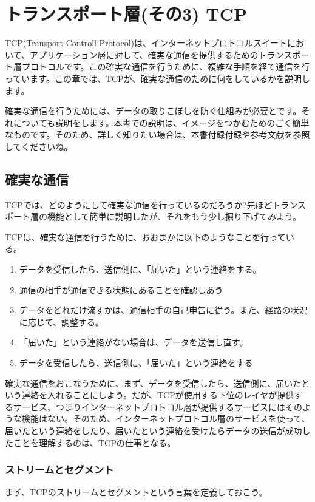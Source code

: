 \chapter{トランスポート層(その3) TCP}


TCP(Transport Controll Protocol)は、インターネットプロトコルスイートにおいて、アプリケーション層に対して、確実な通信を提供するためのトランスポート層プロトコルです。この確実な通信を行うために、複雑な手順を経て通信を行っています。この章では、TCPが、確実な通信のために何をしているかを説明します。

確実な通信を行うためには、データの取りこぼしを防ぐ仕組みが必要とです。それについても説明をします。本書での説明は、イメージをつかむためのごく簡単なものです。そのため、詳しく知りたい場合は、本書付録付録や参考文献を参照してくださいね。

\section{確実な通信}

TCPでは、どのようにして確実な通信を行っているのだろうか?先ほどトランスポート層の機能として簡単に説明したが、それをもう少し掘り下げてみよう。

TCPは、確実な通信を行うために、おおまかに以下のようなことを行っている。

\begin{enumerate}
\item データを受信したら、送信側に、「届いた」という連絡をする。
\item 通信の相手が通信できる状態にあることを確認しあう
\item データをどれだけ流すかは、通信相手の自己申告に従う。また、経路の状況に応じて、調整する。
\item 「届いた」という連絡がない場合は、データを送信し直す。
\item データを受信したら、送信側に、「届いた」という連絡をする
\end{enumerate}


確実な通信をおこなうために、まず、データを受信したら、送信側に、届いたという連絡を入れることにしよう。だが、TCPが使用する下位のレイヤが提供するサービス、つまりインターネットプロトコル層が提供するサービスにはそのような機能はない。そのため、インターネットプロトコル層のサービスを使って、届いたという連絡をしたり、届いたという連絡を受けたらデータの送信が成功したことを理解するのは、TCPの仕事となる。

\subsection{ストリームとセグメント}
まず、TCPのストリームとセグメントという言葉を定義しておこう。

